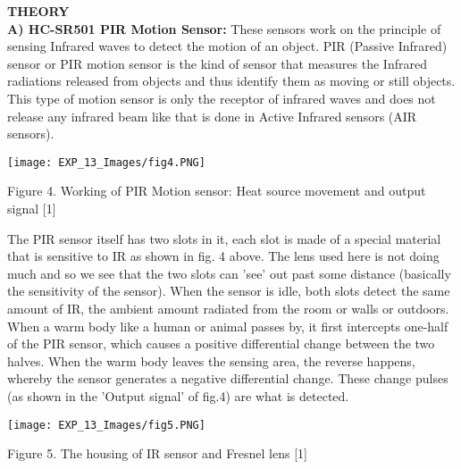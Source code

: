 \documentclass[12pt,a4paper]{article}
\begin{document}
\begin{justify}
\textbf{\large THEORY}\\[3pt]
\textbf{A)	HC-SR501 PIR Motion Sensor: } 
These sensors work on the principle of sensing Infrared waves to detect the motion of an object. PIR (Passive Infrared) sensor or PIR motion sensor is the kind of sensor that measures the Infrared radiations released from objects and thus identify them as moving or still objects. This type of motion sensor is only the receptor of infrared waves and does not release any infrared beam like that is done in Active Infrared sensors (AIR sensors).
\vspace{-6mm}
\begin{center} 
\texttt{[image: EXP\_13\_Images/fig4.PNG]}
\end{center}
\vspace{-10mm}
\begin{center} {Figure 4. Working of PIR Motion sensor: Heat source movement and output signal [1]}\end{center}
\vspace{-5mm}
\noindent The PIR sensor itself has two slots in it, each slot is made of a special material that is sensitive to IR as shown in fig. 4 above. The lens used here is not doing much and so we see that the two slots can 'see' out past some distance (basically the sensitivity of the sensor). When the sensor is idle, both slots detect the same amount of IR, the ambient amount radiated from the room or walls or outdoors. When a warm body like a human or animal passes by, it first intercepts one-half of the PIR sensor, which causes a positive differential change between the two halves. When the warm body leaves the sensing area, the reverse happens, whereby the sensor generates a negative differential change. These change pulses (as shown in the 'Output signal' of fig.4) are what is detected.
\vspace{-5mm}
\begin{center} 
\texttt{[image: EXP\_13\_Images/fig5.PNG]}
\end{center}
\vspace{-5mm}
\begin{center} {Figure 5. The housing of IR sensor and Fresnel lens [1]}\end{center}


\end{justify}
\end{document}
